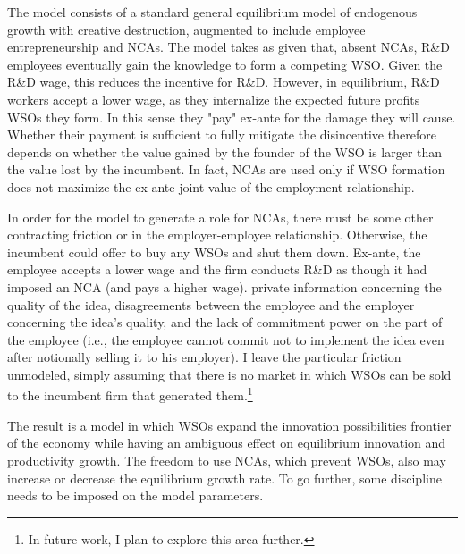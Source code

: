 \documentclass[11pt,english]{article}
\theoremstyle{remark}
\begin{document}
The model consists of a standard general equilibrium model of endogenous growth with creative destruction, augmented to include employee entrepreneurship and NCAs. The model takes as given that, absent NCAs, R\&D employees eventually gain the knowledge to form a competing WSO. Given the R\&D wage, this reduces the incentive for R\&D. However, in equilibrium, R\&D workers accept a lower wage, as they internalize the expected future profits WSOs they form. In this sense they "pay" ex-ante for the damage they will cause. Whether their payment is sufficient to fully mitigate the disincentive therefore depends on whether the value gained by the founder of the WSO is larger than the value lost by the incumbent. In fact, NCAs are used only if WSO formation does not maximize the ex-ante joint value of the employment relationship. 

In order for the model to generate a role for NCAs, there must be some other contracting friction or in the employer-employee relationship.  Otherwise, the incumbent could offer to buy any WSOs and shut them down. Ex-ante, the employee accepts a lower wage and the firm conducts R\&D as though it had imposed an NCA (and pays a higher wage). private information concerning the quality of the idea, disagreements between the employee and the employer concerning the idea's quality, and the lack of commitment power on the part of the employee (i.e., the employee cannot commit not to implement the idea even after notionally selling it to his employer). I leave the particular friction unmodeled, simply assuming that there is no market in which WSOs can be sold to the incumbent firm that generated them.\footnote{In future work, I plan to explore this area further.}

The result is a model in which WSOs expand the innovation possibilities frontier of the economy while having an ambiguous effect on equilibrium innovation and productivity growth. The freedom to use NCAs, which prevent WSOs, also may increase or decrease the equilibrium growth rate. To go further, some discipline needs to be imposed on the model parameters.
\end{document}
